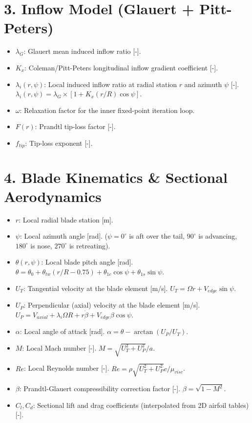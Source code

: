 \documentclass{article}
\begin{document}
\section*{3. Inflow Model (Glauert + Pitt-Peters)}
\begin{itemize}
    \item $\lambda_G$: Glauert mean induced inflow ratio [-].
    \item $K_x$: Coleman/Pitt-Peters longitudinal inflow gradient coefficient [-].
    \item $\lambda_i(r, \psi)$: Local induced inflow ratio at radial station $r$ and azimuth $\psi$ [-]. $\lambda_i(r, \psi) = \lambda_G \times [1 + K_x (r/R) \cos\psi]$.
    \item $\omega$: Relaxation factor for the inner fixed-point iteration loop.
    \item $F(r)$: Prandtl tip-loss factor [-].
    \item $f_{tip}$: Tip-loss exponent [-].
\end{itemize}

\section*{4. Blade Kinematics \& Sectional Aerodynamics}
\begin{itemize}
    \item $r$: Local radial blade station [m].
    \item $\psi$: Local azimuth angle [rad]. ($\psi = 0^\circ$ is aft over the tail, $90^\circ$ is advancing, $180^\circ$ is nose, $270^\circ$ is retreating).
    \item $\theta(r, \psi)$: Local blade pitch angle [rad]. $\theta = \theta_0 + \theta_{tw}(r/R - 0.75) + \theta_{1c} \cos\psi + \theta_{1s} \sin\psi$.
    \item $U_T$: Tangential velocity at the blade element [m/s]. $U_T = \Omega r + V_{edge} \sin\psi$.
    \item $U_P$: Perpendicular (axial) velocity at the blade element [m/s]. $U_P = V_{axial} + \lambda_i \Omega R + r \dot{\beta} + V_{edge} \beta \cos\psi$.
    \item $\alpha$: Local angle of attack [rad]. $\alpha = \theta - \arctan(U_P / U_T)$.
    \item $M$: Local Mach number [-]. $M = \sqrt{U_T^2 + U_P^2} / a$.
    \item $Re$: Local Reynolds number [-]. $Re = \rho \sqrt{U_T^2 + U_P^2} c / \mu_{visc}$.
    \item $\beta$: Prandtl-Glauert compressibility correction factor [-]. $\beta = \sqrt{1 - M^2}$.
    \item $C_l, C_d$: Sectional lift and drag coefficients (interpolated from 2D airfoil tables) [-].
\end{itemize}
\end{document}
